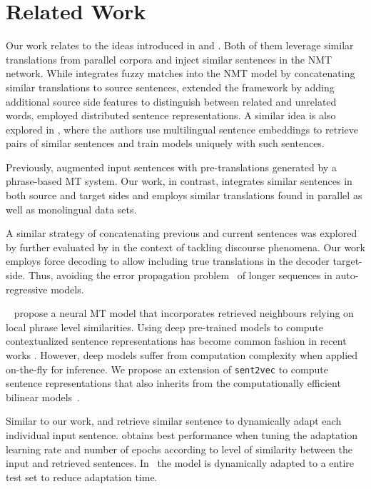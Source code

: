 \section{Related Work}
\label{sec:related}

Our work relates to the ideas introduced in \citet{bulte19neural} and \citet{xu20boosting}.
Both of them leverage similar translations from parallel corpora and inject similar sentences in the NMT network.
While \citet{bulte19neural} integrates fuzzy matches into the NMT model by concatenating similar translations to source sentences, \citet{xu20boosting} extended the framework by adding additional source side features to distinguish between related and unrelated words, employed distributed sentence representations.
A similar idea is also explored in \citet{schwenk2019ccmatrix}, where the authors use multilingual sentence embeddings to retrieve pairs of similar sentences and train models uniquely with such sentences.

Previously, \citet{Niehues16pretranslation} augmented input sentences with pre-translations generated by a phrase-based MT system.
Our work, in contrast, integrates similar sentences in both source and target sides and employs similar translations found in parallel as well as monolingual data sets. 

A similar strategy of concatenating previous and current sentences was explored by \citet{tiedemann17neural} further evaluated by \citet{bawden18evaluating}
in the context of tackling discourse phenomena. 
Our work employs force decoding to allow including true translations in the decoder target-side.
Thus, avoiding the error propagation problem~\cite{Ranzato15sequence} of longer sequences in auto-regressive models.

~\citet{bapna19non} propose a neural MT model that incorporates
retrieved neighbours relying on local phrase level similarities.
%
Using deep pre-trained models \cite{peters18deep,radford19language,Devlin19bert,Conneau19crosslingual} to compute contextualized sentence representations has become common fashion in recent works \cite{feng20languageagnostic,chang20pretraining}.
However, deep models suffer from computation complexity when applied on-the-fly for inference.
We propose an extension of \texttt{sent2vec} \cite{pagliardini18unsupervised} to compute sentence representations that also inherits from the computationally efficient bilinear models~\cite{Mikolov13efficient,Mikolov13distributed,Pennington14glove}. 

Similar to our work, \citet{Farajian17multidomain} and \citet{Li18onesentence} retrieve similar sentence to dynamically adapt each individual input sentence. 
\citet{Farajian17multidomain} obtains best performance when tuning the adaptation learning rate and number of epochs according to level of similarity between the input and retrieved sentences.
In~\citet{xu19lexical} the model is dynamically adapted to a entire test set to reduce adaptation time.

